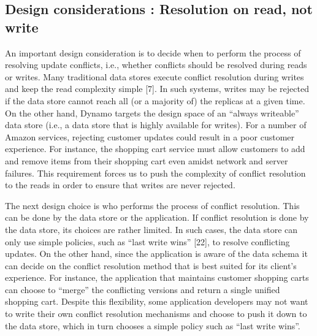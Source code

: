 \subsection{Design considerations : Resolution on read, not write}
An important design consideration is to decide when to perform
the process of resolving update conflicts, i.e., whether conflicts
should be resolved during reads or writes. Many traditional data
stores execute conflict resolution during writes and keep the read
complexity simple [7]. In such systems, writes may be rejected if
the data store cannot reach all (or a majority of) the replicas at a
given time. On the other hand, Dynamo targets the design space
of an “always writeable” data store (i.e., a data store that is highly
available for writes). For a number of Amazon services, rejecting
customer updates could result in a poor customer experience. For
instance, the shopping cart service must allow customers to add
and remove items from their shopping cart even amidst network
and server failures. This requirement forces us to push the
complexity of conflict resolution to the reads in order to ensure
that writes are never rejected. 

The next design choice is who performs the process of conflict
resolution. This can be done by the data store or the application. If
conflict resolution is done by the data store, its choices are rather
limited. In such cases, the data store can only use simple policies,
such as “last write wins” [22], to resolve conflicting updates. On
the other hand, since the application is aware of the data schema it
can decide on the conflict resolution method that is best suited for
its client’s experience. For instance, the application that maintains
customer shopping carts can choose to “merge” the conflicting
versions and return a single unified shopping cart. Despite this
flexibility, some application developers may not want to write
their own conflict resolution mechanisms and choose to push it
down to the data store, which in turn chooses a simple policy such
as “last write wins”. 

